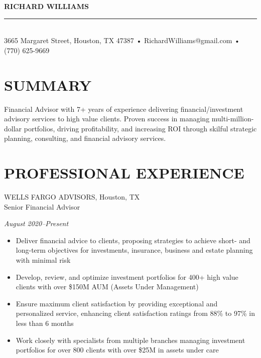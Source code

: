 \documentclass[11pt,letterpaper]{article}
\begin{document}
\begin{flushleft}
    \textbf{\LARGE\color{sectioncolor} RICHARD WILLIAMS} \\[0.5ex]
    \color{black}\rule{\linewidth}{0.5pt} \\[0.5ex]
    3665 Margaret Street, Houston, TX 47387 • RichardWilliams@gmail.com • (770) 625-9669
\end{flushleft}

\section*{SUMMARY}
\vspace{0.5em}
Financial Advisor with 7+ years of experience delivering financial/investment advisory services to high value clients. Proven success in managing multi-million-dollar portfolios, driving profitability, and increasing ROI through skilful strategic planning, consulting, and financial advisory services.

\vspace{1em}
\section*{PROFESSIONAL EXPERIENCE}
\vspace{0.5em}
\begin{minipage}[t]{0.75\textwidth}
WELLS FARGO ADVISORS, Houston, TX \\
Senior Financial Advisor
\end{minipage}
\hfill 
\begin{minipage}[t]{0.2\textwidth}
\hfill \textit{August 2020--Present} 
\end{minipage}

\begin{multicols}{2}
\begin{itemize}[leftmargin=1em,noitemsep,topsep=0pt]
    \item Deliver financial advice to clients, proposing strategies to achieve short- and long-term objectives for investments, insurance, business and estate planning with minimal risk
    \item Develop, review, and optimize investment portfolios for 400+ high value clients with over \$150M AUM (Assets Under Management)
    \item Ensure maximum client satisfaction by providing exceptional and personalized service, enhancing client satisfaction ratings from 88\% to 97\% in less than 6 months
    \item Work closely with specialists from multiple branches managing investment portfolios for over 800 clients with over \$25M in assets under care
\end{itemize}
\end{multicols}
\end{document}
